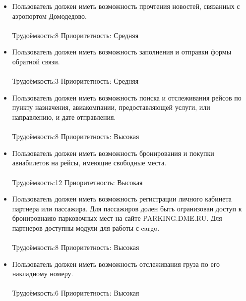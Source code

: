 \begin{enumerate}
\begin{itemize}
            \item Пользователь должен иметь возможность прочтения
                  новостей, связанных с аэропортом Домодедово.
                  \\\\
                  Трудоёмкость:8    Приоритетность: Средняя
                  \\
            \item Пользователь должен иметь возможность заполнения
                  и отправки формы обратной связи.
                  \\\\
                  Трудоёмкость:3    Приоритетность: Средняя
                  \\
            \item Пользователь должен иметь возможность поиска
                  и отслеживания рейсов по пункту назначения,
                  авиакомпании, предоставляющей услуги, или
                  направлению, и дате отправления.
                  \\\\
                  Трудоёмкость:8    Приоритетность: Высокая
                  \\
            \item Пользователь должен иметь возможность бронирования
                  и покупки авиабилетов на рейсы, имеющие
                  свободные места.
                  \\\\
                  Трудоёмкость:12    Приоритетность: Высокая
                  \\
            \item Пользователь должен иметь возможность
                  регистрации личного кабинета партнера или
                  пассажира. Для пассажиров долен быть
                  огранизован доступ к бронировнаию парковочных
                  мест на сайте PARKING.DME.RU. Для партнеров
                  доступны модули для работы с cargo.
                  \\\\
                  Трудоёмкость:8    Приоритетность: Высокая
                  \\
            \item Пользователь должен иметь возможность
                  отслеживания груза по его накладному номеру.
                  \\\\
                  Трудоёмкость:6    Приоритетность: Высокая

\end{itemize}
\end{enumerate}
